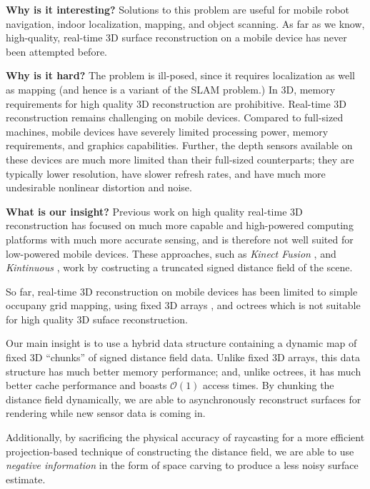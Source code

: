 \documentclass[conference,letterpaper]{IEEEtran}
\begin{document}
\textbf{Why is it interesting?} 
Solutions to this problem are useful for mobile robot navigation,
indoor localization, mapping, and object scanning.  As far as we know,
high-quality, real-time 3D surface reconstruction on a mobile device has never
been attempted before.

\textbf{Why is it hard?}
 The problem is ill-posed, since it requires localization as well as mapping
 (and hence is a variant of the SLAM problem.) In 3D, memory requirements for
 high quality 3D reconstruction are prohibitive. Real-time 3D reconstruction
 remains challenging on mobile devices.  Compared to full-sized machines, mobile
 devices have severely limited processing power, memory requirements, and
 graphics capabilities. Further, the depth sensors available on these devices
 are much more limited than their full-sized counterparts; they are typically
 lower resolution, have slower refresh rates, and have much more undesirable
 nonlinear distortion and noise.

\textbf{What is our insight?} 
Previous work on high quality real-time 3D reconstruction has focused on much
more capable and high-powered computing platforms with much more accurate
sensing, and is therefore not well suited for low-powered mobile devices. These
approaches, such as \textit{Kinect Fusion} \cite{Newcombe}, and
\textit{Kintinuous} \cite{Whelan2013}, work by costructing a truncated signed
distance field of the scene.

So far, real-time 3D reconstruction on mobile devices has been limited to simple
occupany grid mapping, using fixed 3D arrays \cite{Elfes1989, Newcombe}, and
octrees \cite{Wurm2010} which is not suitable for high quality 3D suface
 reconstruction.

Our main insight is to use a hybrid data structure containing a dynamic map of
fixed 3D ``chunks'' of signed distance field data.  Unlike fixed 3D arrays, this
data structure has much better memory performance; and, unlike octrees, it has
much better cache performance and boasts $\mathcal{O}(1)$ access times. By
chunking the distance field dynamically, we are able to asynchronously
reconstruct surfaces for rendering while new sensor data is coming in.

Additionally, by sacrificing the physical accuracy of raycasting for a more
efficient projection-based technique of constructing the distance field, we are
able to use \textit{negative information} in the form of space carving
\cite{Klingensmith2014} to produce a less noisy surface estimate.
\end{document}
